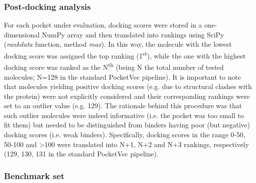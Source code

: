 \subsubsection{Post-docking analysis}

For each pocket under evaluation, docking scores were stored in a one-dimensional NumPy array\cite{harris_array_2020} and then translated into rankings using SciPy\cite{virtanen_scipy_2020} (\textit{rankdata} function, method \textit{max}). In this way, the molecule with the lowest docking score was assigned the top ranking (1\textsuperscript{st}), while the one with the highest docking score was ranked as the N\textsuperscript{th} (being N the total number of tested molecules; N=128 in the standard PocketVec pipeline). It is important to note that molecules yielding positive docking scores (e.g. due to structural clashes with the protein) were not explicitly considered and their corresponding rankings were set to an outlier value (e.g. 129). The rationale behind this procedure was that such outlier molecules were indeed informative (i.e. the pocket was too small to fit them) but needed to be distinguished from binders having poor (but negative) docking scores (i.e. weak binders). Specifically, docking scores in the range 0-50, 50-100 and >100 were translated into N+1, N+2 and N+3 rankings, respectively (129, 130, 131 in the standard PocketVec pipeline).

\subsubsection{Benchmark set}


